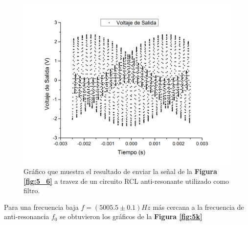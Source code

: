 \documentclass[11pt,a4paper]{article}
\begin{document}
\begin{figure}[H]
\centering
\includegraphics[scale=0.4]{5600hz_Filtrado}
\caption{Gráfico que muestra el resultado de enviar la señal de la \textbf{Figura \ref{fig:5_6}} a travez de un circuito RCL anti-resonante utilizado como filtro.}
\label{fig:5_6_Filt}
\end{figure}

Para una frecuencia baja $f= (5005.5 \pm 0.1)Hz$ más cercana a la frecuencia de anti-resonancia $f_0$ se obtuvieron los gráficos de la \textbf{Figura \ref{fig:5k}}
\end{document}

